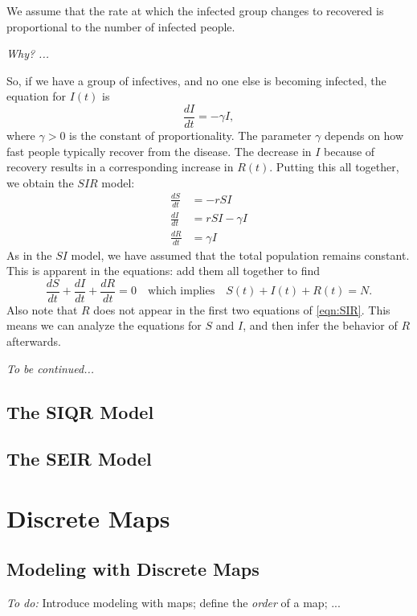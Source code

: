 \documentclass[reqno]{immbook}
\numberwithin{equation}{chapter}
\numberwithin{question}{section}
\numberwithin{theorem}{chapter}
\numberwithin{figure}{chapter}
\theoremstyle{definition}
\begin{document}
We assume that the rate at which the infected
group changes to recovered is proportional to
the number of infected people.

\emph{Why? ...}

So, if we have a group of infectives, and no
one else is becoming infected, the equation
for $I(t)$ is
\begin{equation}
  \frac{dI}{dt} = -\gamma I,
\end{equation}
where $\gamma > 0$ is the constant of proportionality.
The parameter $\gamma$ depends on how fast people
typically recover from the disease.
The decrease in $I$ because of recovery results
in a corresponding increase in $R(t)$.
Putting this all together, we obtain the
$SIR$ model:
\begin{equation}
\begin{split}
   \frac{dS}{dt} & = -r S I \\
   \frac{dI}{dt} & = r S I - \gamma I \\
   \frac{dR}{dt} & = \gamma I
\end{split}
\label{eqn:SIR}
\end{equation}
As in the $SI$ model, we have assumed that the total
population remains constant.  This is apparent in the equations:
add them all together to find
\begin{equation}
   \frac{dS}{dt} + \frac{dI}{dt} + \frac{dR}{dt} = 0
   \quad \textrm{which implies} \quad
   S(t) + I(t) + R(t) = N.
\end{equation}
Also note that $R$ does not appear in the first two equations
of \eqref{eqn:SIR}.  This means we can analyze the equations
for $S$ and $I$, and then infer the behavior of $R$ afterwards.

\medskip
\noindent
\emph{To be continued...}


\section{The SIQR Model}
\section{The SEIR Model}
%
%
%

\chapter{Discrete Maps}
%
\section{Modeling with Discrete Maps}
%
\emph{To do:} Introduce modeling with maps;
define the \emph{order} of a map; ...
\end{document}
